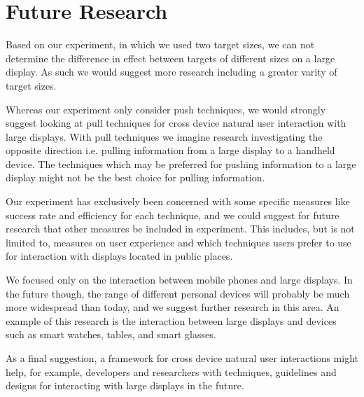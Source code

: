 \section{Future Research} \label{sec:futureresearch}
Based on our experiment, in which we used two target sizes, we can not determine the difference in effect between targets of different sizes on a large display. As such we would suggest more research including a greater varity of target sizes.

Whereas our experiment only consider push techniques, we would strongly suggest looking at pull techniques for cross device natural user interaction with large displays.
With pull techniques we imagine research investigating the opposite direction i.e. pulling information from a large display to a handheld device.
The techniques which may be preferred for pushing information to a large display might not be the best choice for pulling information.

Our experiment has exclusively been concerned with some specific measures like success rate and efficiency for each technique, and we could suggest for future research that other measures be included in experiment.
This includes, but is not limited to, measures on user experience and which techniques users prefer to use for interaction with displays located in public places.

We focused only on the interaction between mobile phones and large displays.
In the future though, the range of different personal devices will probably be much more widespread than today, and we suggest further research in this area.
An example of this research is the interaction between large displays and devices such as smart watches, tables, and smart glasses.

As a final suggestion, a framework for cross device natural user interactions might help, for example, developers and researchers with techniques, guidelines and designs for interacting with large displays in the future.